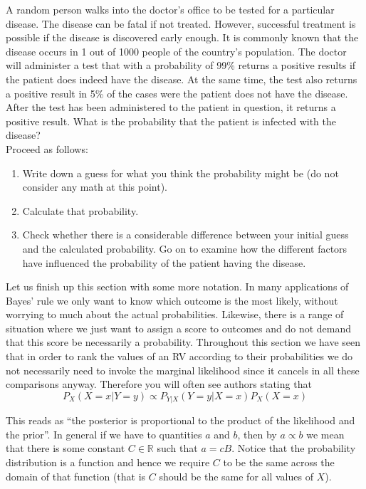 \documentclass[a4paper,11pt,leqno]{report}
\begin{document}
\begin{Exercise}
A random person walks into the doctor's office to be tested for a particular disease. The disease can be fatal if not treated. However,
successful treatment is possible if the disease is discovered early enough. It is commonly known that the disease occurs in 1 out
of 1000 people of the country's population. The doctor will administer a test that with a probability of 99\% returns a positive results
if the patient does indeed have the disease. At the same time, the test also returns a positive result in 5\% of the cases were the
patient does not have the disease. After the test has been administered to the patient in question, it returns a positive result.
What is the probability that the patient is infected with the disease? 
\\
Proceed as follows:
\begin{enumerate}
\item Write down a guess for what you think the probability might be (do not consider any math at this point).
\item Calculate that probability.
\item Check whether there is a considerable difference between your initial guess and the calculated probability. Go on to examine
how the different factors have influenced the probability of the patient having the disease.
\end{enumerate}
\end{Exercise}

Let us finish up this section with some more notation. In many applications of Bayes' rule we only want to know which outcome is
the most likely, without worrying to much about the actual probabilities. Likewise, there is a range of situation where we
just want to assign a score to outcomes and do not demand that this score be necessarily a probability. Throughout this section
we have seen that in order to rank the values of an RV according to their probabilities we do not necessarily need to invoke
the marginal likelihood since it cancels in all these comparisons anyway. Therefore you will often see authors stating that
\begin{equation} \label{proportionality}
P_{X}(X=x|Y=y) \propto P_{Y|X}(Y=y|X=x)P_{X}(X=x)
\end{equation}

This reads as ``the posterior is proportional to the product of the likelihood and the prior''. In general if we have to quantities
$ a $ and $ b $, then by $ a \propto b $ we mean that there is some constant $ C \in \mathbb{R} $ such that $ a = cB $. Notice
that the probability distribution is a function and hence we require $ C $ to be the same across the domain of that function (that
is $ C $ should be the same for all values of $ X $).
\end{document}
